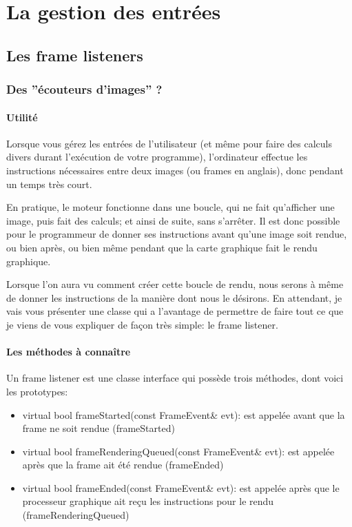 \chapter{La gestion des entr\'ees}




\section{Les frame listeners}





\subsection{Des ''\'ecouteurs d'images'' ?}
\subsubsection{Utilit\'e}
Lorsque vous g\'erez les entr\'ees de l'utilisateur (et m\^eme pour faire des calculs divers durant l'ex\' ecution de votre programme), l'ordinateur effectue les instructions n\'ecessaires entre deux images (ou frames en anglais), donc pendant un temps tr\`es court.

En pratique, le moteur fonctionne dans une boucle, qui ne fait qu'afficher une image, puis fait des calculs; et ainsi de suite, sans s'arr\^eter. Il est donc possible pour le programmeur de donner ses instructions avant qu'une image soit rendue, ou bien apr\`es, ou bien m\^eme pendant que la carte graphique fait le rendu graphique.

Lorsque l'on aura vu comment cr\'eer cette boucle de rendu, nous serons \`{a} m\^eme de donner les instructions de la mani\`ere dont nous le d\'esirons. En attendant, je vais vous pr\'esenter une classe qui a l'avantage de permettre de faire tout ce que je viens de vous expliquer de fa\c{c}on tr\`es simple: le frame listener.



\subsubsection{Les m\'ethodes \`{a} conna\^itre}
Un frame listener est une classe interface qui poss\`ede trois m\'ethodes, dont voici les prototypes:

\begin{itemize}
\item virtual bool frameStarted(const FrameEvent\& evt): est appel\'ee avant que la frame ne soit rendue (frameStarted)
\item virtual bool frameRenderingQueued(const FrameEvent\& evt): est appel\'ee apr\`es que la frame ait \'et\'e rendue (frameEnded)
\item virtual bool frameEnded(const FrameEvent\& evt): est appel\'ee apr\`es que le processeur graphique ait re\c{c}u les instructions pour le rendu (frameRenderingQueued)\newline
\end{itemize}
    


